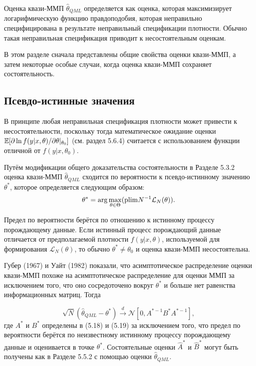 Оценка квази-ММП $\hat{\theta}_{QML}$ определяется как оценка, которая максимизирует логарифмическую функцию правдоподобия, которая неправильно специфицирована в результате неправильный спецификации плотности. Обычно такая неправильная спецификация приводит к несостоятельным оценкам.

В этом разделе сначала представлены общие свойства оценки квази-ММП, а затем некоторые особые случаи, когда оценка квази-ММП сохраняет состоятельность.

\subsection{Псевдо-истинные значения}

В принципе любая неправильная спецификация плотности может привести к несостоятельности, поскольку тогда математическое ожидание оценки $\mathbb{E}[\partial \ln f(y|x,\theta)/\partial \theta|_{\theta_0}]$ (см. раздел 5.6.4) считается с использованием функции отличной от $f(y|x,\theta_0)$.

Путём модификации общего доказательства состоятельности в Разделе 5.3.2 оценка квази-ММП $\hat{\theta}_{QML}$ сходится по вероятности к псевдо-истинному значению $\theta^*$, которое определяется следующим образом:
\begin{equation}
\theta^*= \arg\max _{\theta \in \Theta} (\mathrm{plim } N^{-1} \mathcal{L}_{N}(\theta)).
\end{equation}

Предел по вероятности берётся по отношению к истинному процессу порождающему данные. Если истинный процесс порождающий данные отличается от предполагаемой плотности $f(y|x,\theta)$, используемой для формирования  $\mathcal{L}_{N}(\theta)$, то обычно $\theta^* \not = \theta_0$ и оценка квази-ММП несостоятельна.

Губер (1967) и Уайт (1982) показали, что асимптотическое распределение оценки квази-ММП похоже на асимптотическое распределение для оценки ММП за исключением того, что оно сосредоточено вокруг $\theta^*$ и больше нет равенства информационных матриц. Тогда

\begin{equation}
\sqrt{N}(\hat{\theta}_{QML} - \theta^*) \xrightarrow{d} \mathcal{N}[0,A^{*-1}B^{*}A^{*-1}],
\end{equation}
где $A^*$ и $B^*$ определены в (5.18) и (5.19) за исключением  того, что предел по вероятности берётся по неизвестному истинному процессу порождающему данные и оценивается  в точке $\theta^*$. Состоятельные оценки $\hat{A}^*$ и $\hat{B}^*$ могут быть получены как в Разделе 5.5.2 с помощью оценки $\hat{\theta}_{QML}$.

